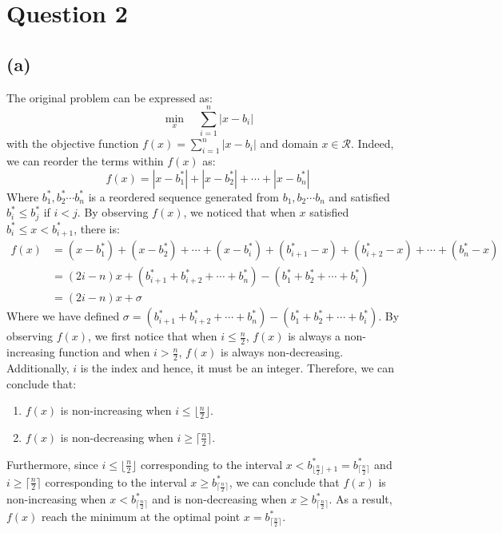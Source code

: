 \documentclass[10pt,a4paper]{article}
\begin{document}
\section*{Question 2}
\subsection*{(a)}
The original problem can be expressed as:
\begin{equation*}
	\displaystyle\min_{x} \quad \displaystyle\sum_{i = 1}^{n} |x - b_{i}|
\end{equation*}
with the objective function $f(x) = \displaystyle\sum_{i = 1}^{n} |x - b_{i}|$ and domain $x \in \mathcal{R}$. Indeed, we can reorder the terms within $f(x)$ as:
\begin{equation*}
	f(x) = |x - b^{*}_{1}| + |x - b^{*}_{2}| + \cdots + |x - b^{*}_{n}|
\end{equation*}
Where $b^{*}_{1}, b^{*}_{2} \cdots b^{*}_{n}$ is a reordered sequence generated from $b_{1}, b_{2} \cdots b_{n}$ and satisfied $b^{*}_{i} \leq b^{*}_{j}$ if $i < j$. By observing $f(x)$, we noticed that when $x$ satisfied $b^{*}_{i} \leq x < b^{*}_{i + 1}$, there is:
\begin{equation*}
	\begin{aligned}
		f(x) &= (x - b^{*}_{1}) + (x - b^{*}_{2}) + \cdots + (x - b^{*}_{i}) + (b^{*}_{i + 1} - x) + (b^{*}_{i + 2} - x) + \cdots + (b^{*}_{n} - x) \\
		&= (2i - n)x + (b^{*}_{i + 1} + b^{*}_{i + 2} + \cdots + b^{*}_{n}) - (b^{*}_{1} + b^{*}_{2} + \cdots +b^{*}_{i}) \\
		&= (2i - n)x + \sigma
	\end{aligned}
\end{equation*}
Where we have defined $\sigma = (b^{*}_{i + 1} + b^{*}_{i + 2} + \cdots + b^{*}_{n}) - (b^{*}_{1} + b^{*}_{2} + \cdots +b^{*}_{i})$. By observing $f(x)$, we first notice that when $i \leq \frac{n}{2}$, $f(x)$ is always a non-increasing function and when $i > \frac{n}{2}$, $f(x)$ is always non-decreasing. Additionally, $i$ is the index and hence, it must be an integer. Therefore, we can conclude that: 
\begin{enumerate}
	\item $f(x)$ is non-increasing when $i \leq \lfloor \frac{n}{2} \rfloor$.
	\item $f(x)$ is non-decreasing when $i \geq \lceil \frac{n}{2} \rceil$.
\end{enumerate}
Furthermore, since $i \leq \lfloor \frac{n}{2} \rfloor$ corresponding to the interval $x  < b^{*}_{\lfloor \frac{n}{2} \rfloor + 1} = b^{*}_{\lceil \frac{n}{2} \rceil}$ and $i \geq \lceil \frac{n}{2} \rceil$ corresponding to the interval $x \geq b^{*}_{\lceil \frac{n}{2} \rceil}$, we can conclude that $f(x)$ is non-increasing when $x < b^{*}_{\lceil \frac{n}{2} \rceil}$ and is non-decreasing when $x \geq b^{*}_{\lceil \frac{n}{2} \rceil}$. As a result, $f(x)$ reach the minimum at the optimal point $x = b^{*}_{\lceil \frac{n}{2} \rceil}$.
\end{document}
